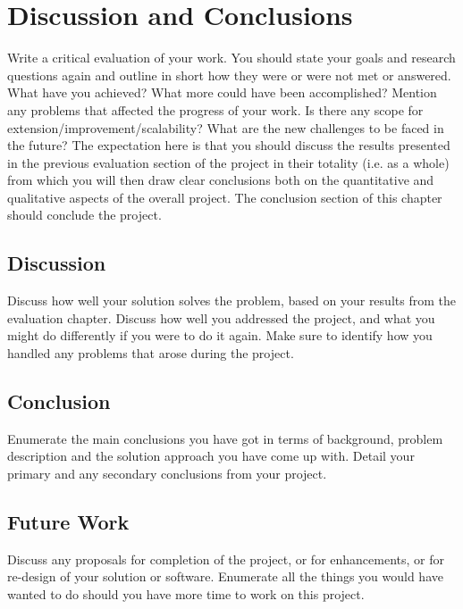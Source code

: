 \chapter{Discussion and Conclusions}
\label{chap:conclusions}
Write a critical evaluation of your work. You should state your goals and research questions again and outline in short how they were or were not met or answered. What have you achieved? What more could have been accomplished? Mention any problems that affected the progress of your work. Is there any scope for extension/improvement/scalability? What are the new challenges to be faced in the future? The expectation here is that you should discuss the results presented in the previous evaluation section of the project in their totality (i.e. as a whole) from which you will then draw clear conclusions both on the quantitative and qualitative aspects of the overall project. The conclusion section of this chapter should conclude the project.

\section{Discussion}
Discuss how well your solution solves the problem, based on your results from the evaluation chapter. Discuss how well you addressed the project, and what you might do differently if you were to do it again. Make sure to identify how you handled any problems that arose during the project.

\section{Conclusion}
Enumerate the main conclusions you have got in terms of background, problem description and the solution approach you have come up with. Detail your primary and any secondary conclusions from your project.

\section{Future Work}
Discuss any proposals for completion of the project, or for enhancements, or for re-design of your solution or software. Enumerate all the things you would have wanted to do should you have more time to work on this project.